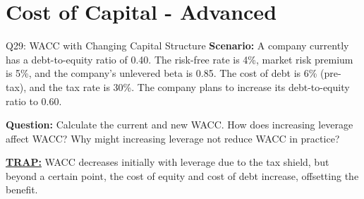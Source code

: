 \documentclass{beamer}
\renewcommand{\scriptsize}{\fontsize{6pt}{7pt}\selectfont}
\begin{document}
	
	\section{Cost of Capital - Advanced}
	
	\begin{frame}{Q29: WACC with Changing Capital Structure}
		\scriptsize
		\textbf{Scenario:} A company currently has a debt-to-equity ratio of 0.40. The risk-free rate is 4\%, market risk premium is 5\%, and the company's unlevered beta is 0.85. The cost of debt is 6\% (pre-tax), and the tax rate is 30\%. The company plans to increase its debt-to-equity ratio to 0.60.
		
		\textbf{Question:} Calculate the current and new WACC. How does increasing leverage affect WACC? Why might increasing leverage not reduce WACC in practice?
		
		\vspace{2pt}
		\underline{\textbf{TRAP:}} WACC decreases initially with leverage due to the tax shield, but beyond a certain point, the cost of equity and cost of debt increase, offsetting the benefit.
	\end{frame}
	
\end{document}
